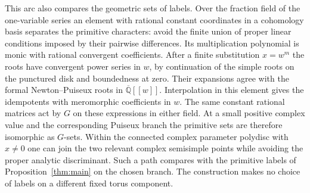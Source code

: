 This arc also compares the geometric sets of labels. Over the fraction field of the one-variable series an element with rational constant coordinates in a cohomology basis separates the primitive characters: avoid the finite union of proper linear conditions imposed by their pairwise differences. Its multiplication polynomial is monic with rational convergent coefficients. After a finite substitution $x=w^m$ the roots have convergent power series in $w$, by continuation of the simple roots on the punctured disk and boundedness at zero. Their expansions agree with the formal Newton--Puiseux roots in $\overline{\mathbb Q}[[w]]$. Interpolation in this element gives the idempotents with meromorphic coefficients in $w$. The same constant rational matrices act by $G$ on these expressions in either field. At a small positive complex value and the corresponding Puiseux branch the primitive sets are therefore isomorphic as $G$-sets. Within the connected complex parameter polydisc with $x\ne0$ one can join the two relevant complex semisimple points while avoiding the proper analytic discriminant. Such a path compares with the primitive labels of Proposition~\ref{thm:main} on the chosen branch. The construction makes no choice of labels on a different fixed torus component.

